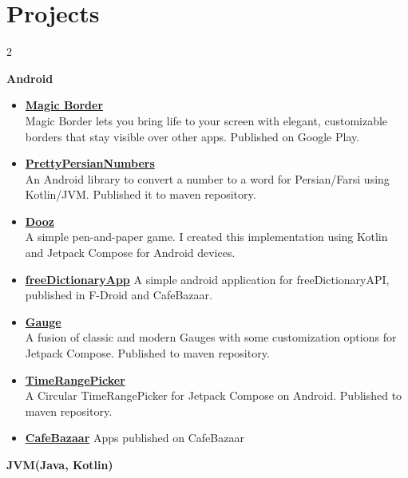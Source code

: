 \section*{\LARGE{Projects}}
\begin{multicols}{2}
    \begin{description}
        \item \textbf{Android}
        \begin{itemize}
            \item \href{https://play.google.com/store/apps/details?id=com.aysa.magicborder&hl=en}{\textbf{Magic Border}}\\
            Magic Border lets you bring life to your screen with elegant, customizable borders that stay visible over other apps.
            Published on Google Play.
            \item \href{https://github.com/yamin8000/PrettyPersianNumbers}{\textbf{PrettyPersianNumbers}}\\
            An Android library to convert a number to a word for Persian/Farsi using Kotlin/JVM.
            Published it to maven repository.
            \item \href{https://github.com/yamin8000/Dooz}{\textbf{Dooz}}\\
            A simple pen-and-paper game.
            I created this implementation using Kotlin and Jetpack Compose for Android devices.
            \item \href{https://github.com/yamin8000/freeDictionaryApp}{\textbf{freeDictionaryApp}}
            A simple android application for freeDictionaryAPI, published in F-Droid and CafeBazaar.
            \item \href{https://github.com/yamin8000/Gauge}{\textbf{Gauge}}\\
            A fusion of classic and modern Gauges with some customization options for Jetpack Compose.
            Published to maven repository.
            \item \href{https://github.com/yamin8000/TimeRangePicker}{\textbf{TimeRangePicker}}\\
            A Circular TimeRangePicker for Jetpack Compose on Android.
            Published to maven repository.
            \item \href{https://cafebazaar.ir/developer/yamin}{\textbf{CafeBazaar}}
            Apps published on CafeBazaar
        \end{itemize}
        \item \textbf{JVM(Java, Kotlin)}
        \begin{itemize}

\end{itemize}
\end{description}
\end{multicols}
